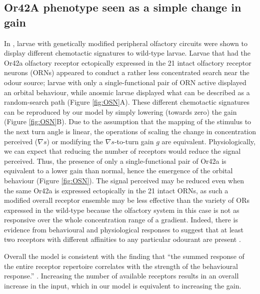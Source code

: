 \documentclass[11pt,a4paper]{article}
\begin{document}
\subsection{Or42A phenotype seen as a simple change in gain}
In \cite{gomez2011active}, larvae with genetically modified peripheral olfactory circuits were shown to display different chemotactic signatures to wild-type larvae.
 Larvae that had the Or42a olfactory receptor ectopically expressed in the 21 intact olfactory receptor neurons (ORNs) appeared to conduct a rather less concentrated search near the odour source; larvae with only a single-functional pair of ORN active displayed an orbital behaviour, while anosmic larvae displayed what can be described as a random-search path (Figure \ref{fig:OSN}A).
 These different chemotactic signatures can be reproduced by our model by simply lowering (towards zero) the gain 
 (Figure \ref{fig:OSN}B).
 Due to the assumption that the mapping of the stimulus to the next turn angle is linear, the operations of scaling the change in concentration perceived ($\nabla s$) or modifying the $\nabla s$-to-turn gain $g$ are equivalent.
  Physiologically, we can expect that reducing the number of receptors would reduce the signal perceived. Thus, the presence of only a single-functional pair of Or42a is equivalent to a lower gain than normal, hence the emergence of the orbital behaviour (Figure \ref{fig:OSN}).
 The signal perceived may be reduced even when the same Or42a is expressed ectopically in the 21 intact ORNs, as such a modified overall receptor ensemble may be less effective than the variety of ORs expressed in the wild-type because the olfactory system in this case is not as responsive over the whole concentration range of a gradient.
  Indeed, there is evidence from behavioural and physiological responses to suggest that at least two receptors with different affinities to any particular odourant are present \citep{kreher2008translation}. 

Overall the model is consistent with the finding that ``the summed response of the entire receptor repertoire correlates with the strength of the behavioural response.” \citep{kreher2008translation}. Increasing the number of available receptors results in an overall increase in the input, which in our model is equivalent to increasing the gain.
\end{document}
